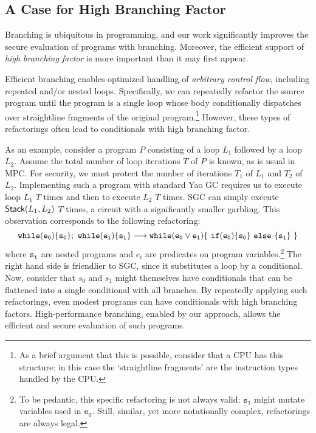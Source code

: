 \subsection{A Case for High Branching Factor}
\label{sec:motivationHighB}

Branching is ubiquitous in programming, and our work significantly
improves the secure evaluation of programs with branching.
Moreover, the efficient support of \emph{high branching factor}
is more important than it may first appear.

Efficient branching
enables optimized handling of \emph{arbitrary
control flow}, including repeated and/or nested loops.
%
Specifically, we can repeatedly refactor the source program
until the program is a single loop whose body conditionally dispatches
over straightline fragments of the original program.\footnote{%
  As a brief argument that this is possible, consider that a
  CPU has this structure: in this case the `straightline
  fragments' are the instruction types handled by the CPU.
}
However, these types of refactorings often lead to conditionals with
high branching factor.

As an example,
consider a program $P$ consisting of a loop $L_1$ followed by a loop
$L_2$.  Assume the total number of loop iterations $T$ of $P$ is
known, as is usual in MPC.
For security, we must protect the number of iterations $T_1$ of $L_1$
and $T_2$ of $L_2$.
Implementing such a program with standard Yao GC requires us to
execute loop $L_1$ $T$ times and then to execute $L_2$ $T$ times.
SGC can simply execute  $\textsf{Stack}(L_1, L_2)$ $T$
times, a circuit with a significantly smaller garbling. This observation corresponds to the
following refactoring:
\[{\tt while (e_0) \{ s_0 \} ; \ while (e_1) \{ s_1 \}}
\longrightarrow {\tt while (e_0 \lor e_1) \{\ if  (e_0) \{s_0\}\  else\  \{s_1\}\ \}} \]
where ${\tt s_i}$ are nested programs and $e_i$ are predicates on program
variables.\footnote{%
  To be pedantic, this specific refactoring is not always
  valid: $\mathtt{s_1}$ might mutate variables used in
  $\mathtt{e_0}$. Still, similar, yet more notationally complex,
  refactorings are always legal.
}
The right hand side is friendlier to SGC, since it
substitutes a loop by a conditional.
Now, consider that $s_0$ and $s_1$ might themselves have conditionals
that can be flattened into a single conditional with all branches.
By repeatedly applying such refactorings, even modest
programs can have conditionals with high branching factors.
High-performance branching, enabled by our approach, allows the
efficient and secure evaluation of such programs.


